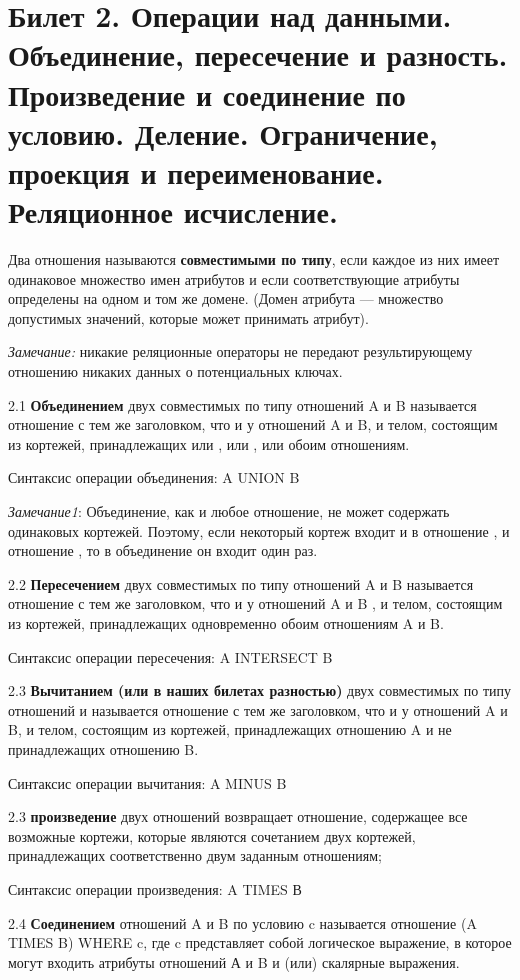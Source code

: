 \newpage
\section{Билет 2. Операции над данными. Объединение, пересечение и разность. Произведение и соединение по условию. Деление. Ограничение, проекция и переименование. Реляционное исчисление.}

Два отношения называются  \textbf{совместимыми по типу}, если каждое из них имеет одинаковое множество имен атрибутов и если соответствующие атрибуты определены на одном и том же домене. 
(Домен атрибута — множество допустимых значений, которые может принимать атрибут). 

\textit{Замечание:} никакие реляционные операторы не передают результирующему отношению никаких данных о потенциальных ключах.

2.1 \textbf{Объединением} двух совместимых по типу отношений A и B называется отношение с тем же заголовком, что и у отношений A и B, и телом, состоящим из кортежей, принадлежащих или , или , или обоим отношениям.

Синтаксис операции объединения: A UNION B

\textit{Замечание1}: Объединение, как и любое отношение, не может содержать одинаковых кортежей. Поэтому, если некоторый кортеж входит и в отношение , и отношение , то в объединение он входит один раз.

2.2 \textbf{Пересечением} двух совместимых по типу отношений A и B называется отношение с тем же заголовком, что и у отношений A и B , и телом, состоящим из кортежей, принадлежащих одновременно обоим отношениям A и B.

Синтаксис операции пересечения: A INTERSECT B

2.3 \textbf{Вычитанием (или в наших билетах разностью)} двух совместимых по типу отношений  и  называется отношение с тем же заголовком, что и у отношений A и B, и телом, состоящим из кортежей, принадлежащих отношению A и не принадлежащих отношению B. 

Синтаксис операции вычитания: A MINUS B


2.3  \textbf{произведение}  двух отношений возвращает отношение, содержащее все возможные кортежи, которые являются сочетанием двух кортежей, принадлежащих соответственно двум заданным отношениям;

Синтаксис операции произведения: A TIMES В

2.4 \textbf{Соединением} отношений A и B по условию c называется отношение (A TIMES B) WHERE c, где c представляет собой логическое выражение, в которое могут входить атрибуты отношений А и B и (или) скалярные выражения.

